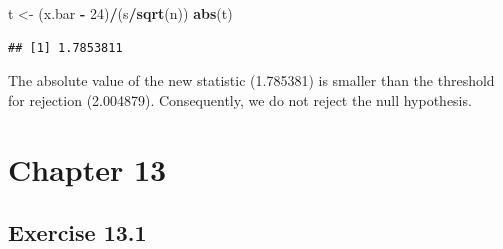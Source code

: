 \documentclass[]{krantz}
\makeatletter
\newenvironment{Shaded}{\begin{snugshade}}{\end{snugshade}}
\newcommand{\KeywordTok}[1]{\textcolor[rgb]{0.13,0.29,0.53}{\textbf{#1}}}
\newcommand{\DecValTok}[1]{\textcolor[rgb]{0.00,0.00,0.81}{#1}}
\newcommand{\StringTok}[1]{\textcolor[rgb]{0.31,0.60,0.02}{#1}}
\newcommand{\OperatorTok}[1]{\textcolor[rgb]{0.81,0.36,0.00}{\textbf{#1}}}
\newcommand{\NormalTok}[1]{#1}
\newenvironment{kframe}{%
\medskip{}
\setlength{\fboxsep}{.8em}
 \def\at@end@of@kframe{}%
 \ifinner\ifhmode%
  \def\at@end@of@kframe{\end{minipage}}%
  \begin{minipage}{\columnwidth}%
 \fi\fi%
 \def\FrameCommand##1{\hskip\@totalleftmargin \hskip-\fboxsep
 \colorbox{shadecolor}{##1}\hskip-\fboxsep
     \hskip-\linewidth \hskip-\@totalleftmargin \hskip\columnwidth}%
 \MakeFramed {\advance\hsize-\width
   \@totalleftmargin\z@ \linewidth\hsize
   \@setminipage}}%
 {\par\unskip\endMakeFramed%
 \at@end@of@kframe}
\renewenvironment{Shaded}{\begin{kframe}}{\end{kframe}}
\theoremstyle{definition}
\theoremstyle{definition}
\theoremstyle{definition}
\theoremstyle{remark}
\makeatother
\begin{document}
\begin{enumerate}
\begin{Shaded}
\begin{Highlighting}[]
\NormalTok{t <-}\StringTok{ }\NormalTok{(x.bar }\OperatorTok{-}\StringTok{ }\DecValTok{24}\NormalTok{)}\OperatorTok{/}\NormalTok{(s}\OperatorTok{/}\KeywordTok{sqrt}\NormalTok{(n))}
\KeywordTok{abs}\NormalTok{(t)}
\end{Highlighting}
\end{Shaded}

\begin{verbatim}
## [1] 1.7853811
\end{verbatim}

  The absolute value of the new statistic (1.785381) is smaller than the
  threshold for rejection (2.004879). Consequently, we do not reject the
  null hypothesis.
\end{enumerate}

\section*{Chapter 13}\label{chapter-13}


\subsection*{Exercise 13.1}\label{exercise-13.1}
\end{document}
